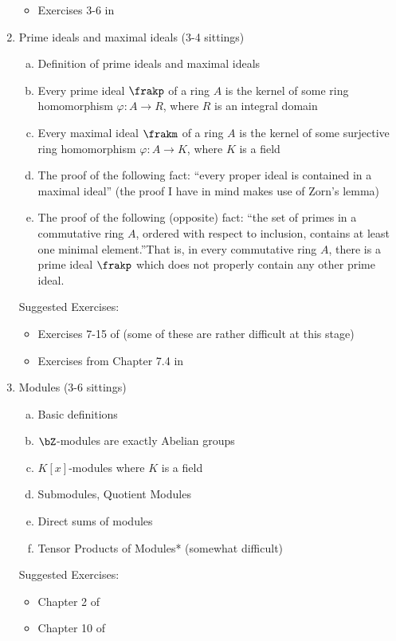 \begin{enumerate}[(1)]
\begin{itemize}
			\item Exercises 3-6 in \cite[Chapter 1]{am}
		\end{itemize}
	\item Prime ideals and maximal ideals {(3-4 sittings)}
		\begin{enumerate}[(a)]
			\item Definition of prime ideals and maximal ideals
			\item Every prime ideal $\frakp$ of a ring $A$ is the kernel of some ring homomorphism $\varphi:A\to R$, where $R$ is an integral domain\
			\item Every maximal ideal $\frakm$ of a ring $A$ is the kernel of some surjective ring homomorphism $\varphi:A\to K$, where $K$ is a field
			\item The proof of the following fact: ``every proper ideal is contained in a maximal ideal'' (the proof I have in mind makes use of Zorn's lemma)
			\item The proof of the following (opposite) fact: ``the set of primes in a commutative ring $A$, ordered with respect to inclusion, contains at least one minimal element.''That is, in every commutative ring $A$, there is a prime ideal $\frakp$ which does not properly contain any other prime ideal.
		\end{enumerate}
		Suggested Exercises:
		\begin{itemize}
			\item Exercises 7-15 of \cite[Chapter 1]{am} (some of these are rather difficult at this stage)
			\item Exercises from Chapter 7.4 in \cite{dummit-foote}
		\end{itemize}
	\item Modules (3-6 sittings)
		\begin{enumerate}[(a)]
			\item Basic definitions
			\item $\bZ$-modules are exactly Abelian groups
			\item $K[x]$-modules where $K$ is a field \cite[Chapter 10.1]{dummit-foote}
			\item Submodules, Quotient Modules
			\item Direct sums of modules
			\item Tensor Products of Modules* (somewhat difficult)
		\end{enumerate}
		Suggested Exercises:
		\begin{itemize}
			\item Chapter 2 of \cite{am}
			\item Chapter 10 of \cite{dummit-foote}

\end{itemize}
\end{enumerate}
